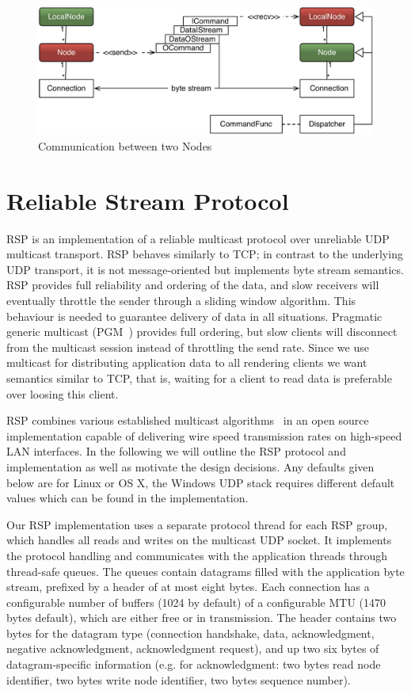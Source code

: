 \begin{figure}[h!t]\center
  \includegraphics[width=\textwidth]{images/netNode.pdf}
  {\caption{\label{fNetNode}Communication between two Nodes}}
\end{figure}

\section{Reliable Stream Protocol}\label{sec:RSP}

RSP is an implementation of a reliable multicast protocol over unreliable UDP
multicast transport. RSP behaves similarly to TCP; in contrast to the underlying
UDP transport, it is not message-oriented but implements byte stream semantics.
RSP provides full reliability and ordering of the data, and slow receivers will
eventually throttle the sender through a sliding window algorithm. This behaviour
is needed to guarantee delivery of data in all situations. Pragmatic generic
multicast (PGM~\cite{pgm}) provides full ordering, but slow clients will
disconnect from the multicast session instead of throttling the send rate. Since
we use multicast for distributing application data to all rendering clients we
want semantics similar to TCP, that is, waiting for a client to read data is
preferable over loosing this client.

RSP combines various established multicast
algorithms~\cite{adamson2004negative,Gau:2002} in an open source implementation
capable of delivering wire speed transmission rates on high-speed LAN
interfaces. In the following we will outline the RSP protocol and implementation
as well as motivate the design decisions. Any defaults given below are for Linux
or OS X, the Windows UDP stack requires different default values which can be
found in the implementation.

Our RSP implementation uses a separate protocol thread for each RSP group, which
handles all reads and writes on the multicast UDP socket. It implements the
protocol handling and communicates with the application threads through
thread-safe queues. The queues contain datagrams filled with the application
byte stream, prefixed by a header of at most eight bytes. Each connection has a
configurable number of buffers (1024 by default) of a configurable MTU (1470
bytes default), which are either free or in transmission. The header contains
two bytes for the datagram type (connection handshake, data, acknowledgment,
negative acknowledgment, acknowledgment request), and up two six bytes of
datagram-specific information (e.g. for acknowledgment: two bytes read node
identifier, two bytes write node identifier, two bytes sequence number).

